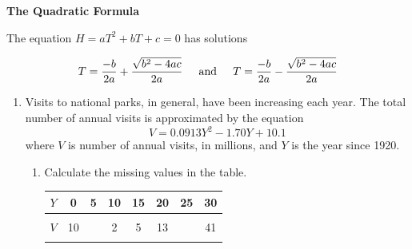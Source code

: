 \documentclass[11pt]{article}
\begin{document}
 \vspace{.2in}
 
 \begin{center}
\textbf{The Quadratic Formula}
\vspace{.1in}

The equation $H=aT^2+bT+c=0$ has solutions 


$$\displaystyle T=\frac{-b}{2a} + \frac{\sqrt{b^2-4ac}}{2a} \hspace{.2in} \text{and} \hspace{.2in}T=\frac{-b}{2a} - \frac{\sqrt{b^2-4ac}}{2a}$$

 \end{center}
\hrulefill

\newpage

\begin{enumerate}

\item Visits to national parks, in general, have been increasing each year.  The total number of annual visits is approximated by the equation $$V = 0.0913Y^2-1.70Y+10.1$$
where $V$ is number of annual visits, in millions, and $Y$ is the year since 1920.

\begin{enumerate}
\item Calculate the missing values in the table.




\begin{center}
\begin{tabular} {|c ||c |c |c |c |c |c |c |} \hline
$Y$ & \hspace{.25in}0  \hspace{.25in}   &\hspace{.25in} 5\hspace{.25in} & \hspace{.25in} 10   \hspace{.25in} &\hspace{.25in} 15  \hspace{.25in}  & \hspace{.25in}20   \hspace{.25in}  &\hspace{.25in}25  \hspace{.25in}& \hspace{.25in} 30 \hspace{.25in}  \\ \hline
&&&&&&& \\
$V$ &10 &  & 2 & 5 & 13 &   & 41  \\ 
&&&&&&& \\ \hline
\end{tabular}
\end{center}





\end{enumerate}
\end{enumerate}
\end{document}
